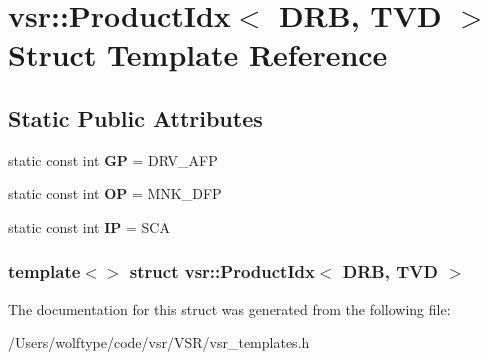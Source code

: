\hypertarget{structvsr_1_1_product_idx_3_01_d_r_b_00_01_t_v_d_01_4}{\section{vsr\-:\-:Product\-Idx$<$ D\-R\-B, T\-V\-D $>$ Struct Template Reference}
\label{structvsr_1_1_product_idx_3_01_d_r_b_00_01_t_v_d_01_4}
}
\subsection*{Static Public Attributes}
\begin{DoxyCompactItemize}
\item 
\hypertarget{structvsr_1_1_product_idx_3_01_d_r_b_00_01_t_v_d_01_4_a71e5b66b35c0c5e29e426d2740298bce}{static const int {\bfseries G\-P} = D\-R\-V\-\_\-\-A\-F\-P}\label{structvsr_1_1_product_idx_3_01_d_r_b_00_01_t_v_d_01_4_a71e5b66b35c0c5e29e426d2740298bce}

\item 
\hypertarget{structvsr_1_1_product_idx_3_01_d_r_b_00_01_t_v_d_01_4_acc2a10a147b08d0e198bafee093987a9}{static const int {\bfseries O\-P} = M\-N\-K\-\_\-\-D\-F\-P}\label{structvsr_1_1_product_idx_3_01_d_r_b_00_01_t_v_d_01_4_acc2a10a147b08d0e198bafee093987a9}

\item 
\hypertarget{structvsr_1_1_product_idx_3_01_d_r_b_00_01_t_v_d_01_4_a9528a0866fee538d2d52ed70577b8148}{static const int {\bfseries I\-P} = S\-C\-A}\label{structvsr_1_1_product_idx_3_01_d_r_b_00_01_t_v_d_01_4_a9528a0866fee538d2d52ed70577b8148}

\end{DoxyCompactItemize}
\subsubsection*{template$<$$>$ struct vsr\-::\-Product\-Idx$<$ D\-R\-B, T\-V\-D $>$}



The documentation for this struct was generated from the following file\-:\begin{DoxyCompactItemize}
\item 
/\-Users/wolftype/code/vsr/\-V\-S\-R/vsr\-\_\-templates.\-h\end{DoxyCompactItemize}
